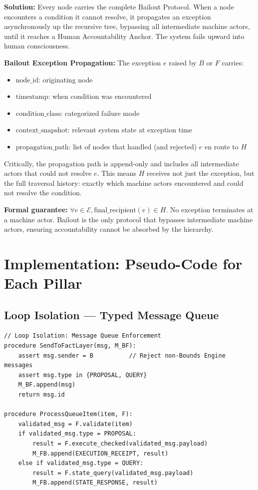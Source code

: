 \documentclass[12pt]{article}
\begin{document}
\textbf{Solution:} Every node carries the complete Bailout Protocol. When a node encounters a condition it cannot resolve, it propagates an exception asynchronously up the recursive tree, bypassing all intermediate machine actors, until it reaches a Human Accountability Anchor. The system fails upward into human consciousness.

\textbf{Bailout Exception Propagation:} The exception $e$ raised by $B$ or $F$ carries:
\begin{itemize}
\itemsep0em
\item $\text{node\_id}$: originating node
\item $\text{timestamp}$: when condition was encountered
\item $\text{condition\_class}$: categorized failure mode
\item $\text{context\_snapshot}$: relevant system state at exception time
\item $\text{propagation\_path}$: list of nodes that handled (and rejected) $e$ en route to $H$
\end{itemize}

Critically, the propagation path is append-only and includes all intermediate actors that could not resolve $e$. This means $H$ receives not just the exception, but the full traversal history: exactly which machine actors encountered and could not resolve the condition.

\textbf{Formal guarantee:} $\forall e \in \mathcal{E}, \text{final\_recipient}(e) \in H$. No exception terminates at a machine actor. Bailout is the only protocol that bypasses intermediate machine actors, ensuring accountability cannot be absorbed by the hierarchy.

\section{Implementation: Pseudo-Code for Each Pillar}
\label{sec:implementation}

\subsection{Loop Isolation — Typed Message Queue}

\begin{verbatim}
// Loop Isolation: Message Queue Enforcement
procedure SendToFactLayer(msg, M_BF):
    assert msg.sender = B          // Reject non-Bounds Engine messages
    assert msg.type in {PROPOSAL, QUERY}
    M_BF.append(msg)
    return msg.id

procedure ProcessQueueItem(item, F):
    validated_msg = F.validate(item)
    if validated_msg.type = PROPOSAL:
        result = F.execute_checked(validated_msg.payload)
        M_FB.append(EXECUTION_RECEIPT, result)
    else if validated_msg.type = QUERY:
        result = F.state_query(validated_msg.payload)
        M_FB.append(STATE_RESPONSE, result)
\end{verbatim}
\end{document}
